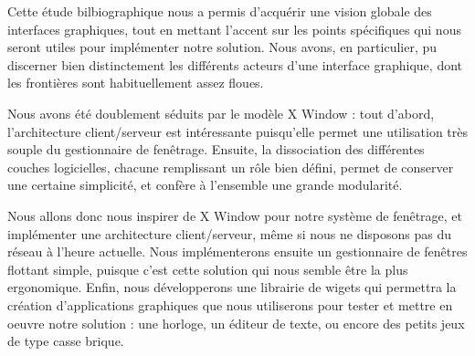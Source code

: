Cette étude bilbiographique nous a permis d'acquérir une vision globale des interfaces graphiques, tout en mettant l'accent sur les points spécifiques qui nous seront utiles pour implémenter notre solution. Nous avons, en particulier, pu discerner bien distinctement les différents acteurs d'une interface graphique, dont les frontières sont habituellement assez floues.

Nous avons été doublement séduits par le modèle X Window : tout d'abord, l'architecture client/serveur est intéressante puisqu'elle permet une utilisation très souple du gestionnaire de fenêtrage. Ensuite, la dissociation des différentes couches logicielles, chacune remplissant un rôle bien défini, permet de conserver une certaine simplicité, et confère à l'ensemble une grande modularité. 

Nous allons donc nous inspirer de X Window pour notre système de fenêtrage, et implémenter une architecture client/serveur, même si nous ne disposons pas du réseau à l'heure actuelle. Nous implémenterons ensuite un gestionnaire de fenêtres flottant simple, puisque c'est cette solution qui nous semble être la plus ergonomique. Enfin, nous développerons une librairie de wigets qui permettra la création d'applications graphiques que nous utiliserons pour tester et mettre en oeuvre notre solution : une horloge, un éditeur de texte, ou encore des petits jeux de type casse brique.

